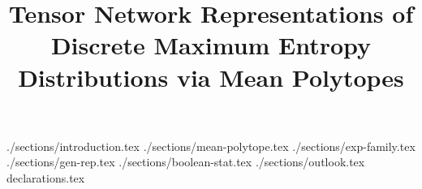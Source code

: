 \documentclass[pdflatex,sn-mathphys-num]{sn-jnl}%
\theoremstyle{thmstyleone}%
\theoremstyle{thmstyletwo}%
\theoremstyle{thmstylethree}%
\begin{document}
    \title[Tensor Network Representations of Discrete Maximum Entropy Distributions via Mean Polytopes]{
        Tensor Network Representations of Discrete Maximum Entropy Distributions via Mean Polytopes
    }


    \author*[1]{ }
    \author[1]{ }





    \abstract{
        
    }

    \keywords{
        
    }



    \maketitle

    {./sections/introduction.tex}
    {./sections/mean-polytope.tex}
    {./sections/exp-family.tex}
    {./sections/gen-rep.tex}
    {./sections/boolean-stat.tex}
    {./sections/outlook.tex}
    {declarations.tex}

%    
\end{document}
